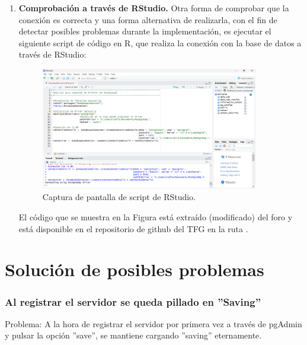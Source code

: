 \begin{enumerate}[label=\alph*]
    \item \textbf{Comprobación a través de RStudio.} Otra forma de comprobar que la conexión es correcta y una forma alternativa de realizarla, con el fin de detectar posibles problemas durante la implementación, es ejecutar el siguiente script de código en R, que realiza la conexión con la base de datos a través de RStudio:
    
    \begin{figure}[H]
    \centering
    \includegraphics[width=0.90\textwidth]{figures/RStudio.png}
     \caption{Captura de pantalla de script de RStudio.}
    \label{fig:RStudio}
    \end{figure}

    El código que se muestra en la Figura está extraído (modificado) del foro \parencite{forumBroadseaDB} y está disponible en el repositorio de github del TFG en la ruta 
     \parencite{vallealonsodc}.
    
\end{enumerate}

\section{Solución de posibles problemas} \label{sec:03problemas}

\subsubsection{Al registrar el servidor se queda pillado en ''Saving''}
Problema: A la hora de registrar el servidor por primera vez a través de pgAdmin y pulsar la opción ''save'', se mantiene cargando ''saving'' eternamente.

